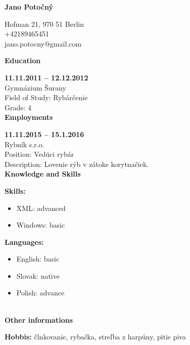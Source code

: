\documentclass[12pt, a4paper]{article}
\begin{document}
        \begin{center} \huge \bfseries Jano Potočný\end{center}
Hofman 21, 970 51 Berlin\\
+42189465451\\
jano.potocny@gmail.com\\

{\hrulefill \large \bfseries Education\hrulefill}

\vspace{0.2cm}
{\bfseries 11.11.2011 -- 12.12.2012}\\Gymnázium Šurany\\Field of Study: Rybárčenie\\Grade: 4\\

{\hrulefill \large \bfseries Employments\hrulefill}

\vspace{0.2cm}
{\bfseries 11.11.2015 -- 15.1.2016}\\Rybník s.r.o.\\ Position: Vedúci rybár\\ Description: Lovenie rýb v zátoke korytnačiek.\\

{\hrulefill \large \bfseries Knowledge and Skills\hrulefill}

\vspace{0.2cm}\begin{minipage}[t]{6cm}{\bfseries Skills:}
    \begin{itemize}[leftmargin=0.5cm,topsep=0cm]
    \setlength\itemsep{-0.2cm}\item XML: advanced\item Windows: basic\end{itemize}\end{minipage}\begin{minipage}[t]{6cm}{\bfseries Languages:}
    \begin{itemize}[leftmargin=0.5cm,topsep=0cm]
    \setlength\itemsep{-0.2cm}\item English: basic\item Slovak: native\item Polish: advance\end{itemize}\end{minipage} \\

{\hrulefill \large \bfseries Other informations\hrulefill}

\vspace{0.2cm}
{\bfseries Hobbis:} člnkovanie, rybačka, streľba z harpúny, pitie piva
\end{document}
